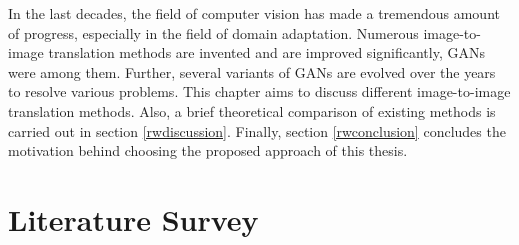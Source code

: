 
\justifying
\setlength{\parskip}{1em}

In the last decades, the field of computer vision has made a tremendous amount of progress, especially in the field of domain adaptation. Numerous image-to-image translation methods are invented and are improved significantly, \acp{GAN} were among them. Further, several variants of \acp{GAN} are evolved over the years to resolve various problems. This chapter aims to discuss different image-to-image translation methods. Also, a brief theoretical comparison of existing methods is carried out in section \ref{rwdiscussion}. Finally, section \ref{rwconclusion} concludes the motivation behind choosing the proposed approach of this thesis.

\section{Literature Survey}\label{LiteratureSurvey}


